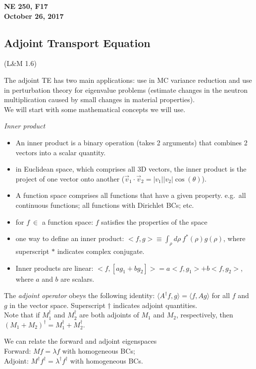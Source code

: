 \documentclass[12pt]{article}
\begin{document}
\begin{center}
{\bf NE 250, F17\\
October 26, 2017 
}
\end{center}

\subsection*{Adjoint Transport Equation} (L\&M 1.6)

The adjoint TE has two main applications: use in MC variance reduction and use in perturbation theory for eigenvalue problems (estimate changes in the neutron multiplication caused by small changes in material properties). \\
We will start with some mathematical concepts we will use.

\textit{Inner product}
\begin{itemize}
\item An inner product is a binary operation (takes 2 arguments) that combines 2 vectors into a scalar quantity.
\item in Euclidean space, which comprises all 3D vectors, the inner product is the project of one vector onto another ($\vec{v}_1 \cdot \vec{v}_2 = |v_1||v_2|\cos(\theta)$).
\item A function space comprises all functions that have a given property. e.g.\ all continuous functions; all functions with Dirichlet BCs; etc.
\item for $f \: \in$ a function space: $f$ satisfies the properties of the space
\item one way to define an inner product: $<f,g> \equiv \int_{\rho} d\rho \: f^{*}(\rho) g(\rho)$, where superscript $*$ indicates complex conjugate.
\item Inner products are linear: $<f, [ag_1 + bg_2]> = a<f, g_1> + b<f, g_2>$, where $a$ and $b$ are scalars.
\end{itemize}

The \textit{adjoint operator} obeys the following identity: $\langle A^{\dagger}f, g\rangle = \langle f, Ag\rangle$ for all $f$ and $g$ in the vector space. Superscript $\dagger$ indicates adjoint quantities.\\
Note that if $M_1^{\dagger}$ and $M_2^{\dagger}$ are both adjoints of $M_1$ and $M_2$, respectively, then $(M_1 + M_2)^{\dagger}  = M_1^{\dagger} + M_2^{\dagger}$.

We can relate the forward and adjoint eigenspaces\\
Forward: $Mf = \lambda f$ with homogeneous BCs;\\
Adjoint: $M^{\dagger}f^{\dagger} = \lambda^{\dagger} f^{\dagger}$ with homogeneous BCs.
\end{document}
